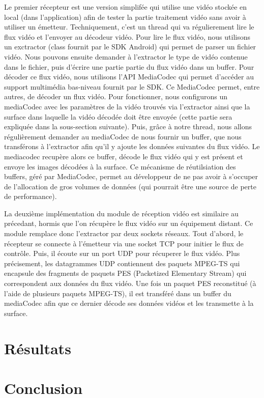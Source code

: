 \documentclass[11pt,a4paper]{article}
\begin{document}
\bigbreak
Le premier récepteur est une version simplifée qui utilise une vidéo stockée en local (dans l'application) afin de tester la partie traitement vidéo sans avoir à utiliser un émetteur.
Techniquement, c'est un thread qui va régulierement lire le flux vidéo et l'envoyer au décodeur vidéo. 
Pour lire le flux vidéo, nous utilisons un exctractor (class fournit par le SDK Android) qui permet de parser un fichier vidéo. Nous pouvons ensuite demander à l'extractor le type de vidéo contenue dans le fichier, puis d'écrire une partie partie du flux vidéo dans un buffer.
Pour décoder ce flux vidéo, nous utilisons l'API MediaCodec qui permet d'accéder au support multimédia bas-niveau fournit par le SDK. Ce MediaCodec permet, entre autres, de décoder un flux vidéo.
Pour fonctionner, nous configurons un mediaCodec avec les paramètres de la vidéo trouvés via l'extractor ainsi que la surface dans laquelle la vidéo décodée doit être envoyée (cette partie sera expliquée dans la sous-section suivante).
Puis, grâce à notre thread, nous allons régulièrement demander au mediaCodec de nous fournir un buffer, que nous transférons à l'extractor afin qu'il y ajoute les données suivantes du flux vidéo.
Le mediacodec recupère alors ce buffer, décode le flux vidéo qui y est présent et envoye les images décodées à la surface.
Ce mécanisme de réutilsiation des buffers, géré par MediaCodec, permet au développeur de ne pas avoir à s'occuper de l'allocation de gros volumes de données (qui pourrait être une source de perte de performance). 

\bigbreak
La deuxième implémentation du module de réception vidéo est similaire au précedant, hormis que l'on récupère le flux vidéo sur un équipement distant.
Ce module remplace donc l'extractor par deux sockets réseaux.
Tout d'abord, le récepteur se connecte à l'émetteur via une socket TCP pour initier le flux de contrôle.
Puis, il écoute sur un port UDP pour récuperer le flux vidéo.
Plus précisement, les datagrammes UDP contiennent des paquets MPEG-TS qui encapsule des fragments de paquets PES (Packetized Elementary Stream) qui correspondent aux données du flux vidéo.
Une fois un paquet PES reconstitué (à l'aide de plusieurs paquets MPEG-TS), il est transféré dans un buffer du mediaCodec afin que ce dernier décode ses données vidéos et les transmette à la surface.

\section{Résultats}

\section{Conclusion}
\end{document}
